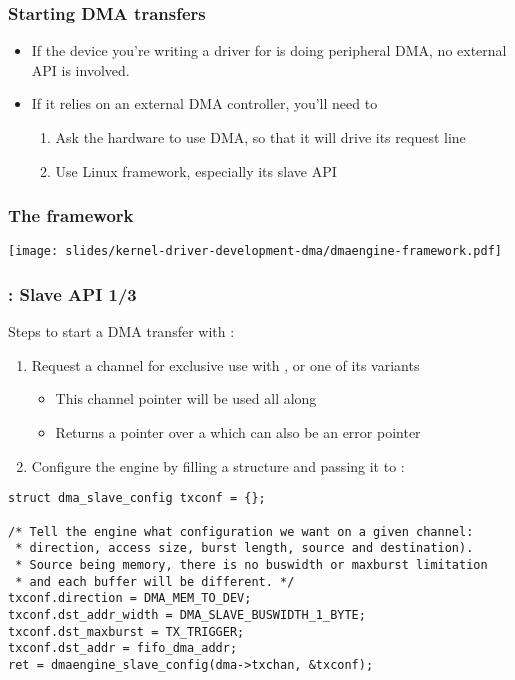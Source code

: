 \begin{frame}
  \frametitle{Starting DMA transfers}
  \begin{itemize}
  \item If the device you're writing a driver for is doing peripheral
    DMA, no external API is involved.
  \item If it relies on an external DMA controller, you'll need to
    \begin{enumerate}
    \item Ask the hardware to use DMA, so that it will drive its
      request line
    \item Use Linux  framework, especially its slave API
    \end{enumerate}
  \end{itemize}
\end{frame}

\begin{frame}[fragile]
  \frametitle{The  framework}
  \begin{center}
    \texttt{[image: slides/kernel-driver-development-dma/dmaengine-framework.pdf]}
  \end{center}
\end{frame}

\begin{frame}[fragile]
  \frametitle{: Slave API 1/3}
  Steps to start a DMA transfer with :
  \begin{enumerate}
  \item Request a channel for exclusive use with
    , or one of its variants
    \begin{itemize}
    \item This channel pointer will be used all along
    \item Returns a pointer over a  which can also
      be an error pointer
    \end{itemize}
  \item Configure the engine by filling a 
    structure and passing it to :
  \end{enumerate}
\begin{verbatim}
struct dma_slave_config txconf = {};

/* Tell the engine what configuration we want on a given channel:
 * direction, access size, burst length, source and destination).
 * Source being memory, there is no buswidth or maxburst limitation
 * and each buffer will be different. */
txconf.direction = DMA_MEM_TO_DEV;
txconf.dst_addr_width = DMA_SLAVE_BUSWIDTH_1_BYTE;
txconf.dst_maxburst = TX_TRIGGER;
txconf.dst_addr = fifo_dma_addr;
ret = dmaengine_slave_config(dma->txchan, &txconf);
\end{verbatim}
\end{frame}

